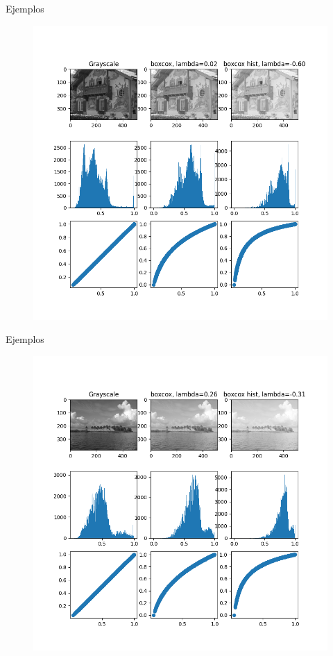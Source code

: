 \documentclass{beamer}
\begin{document}
\begin{frame}{Ejemplos}
\begin{figure}
    \centering
    \includegraphics[scale=0.3] {plot_I24.BMP.png  }
    \label{fig:my_label}
\end{figure}

\end{frame}
\begin{frame}{Ejemplos}
\begin{figure}
    \centering
    \includegraphics[scale=0.3] {plot_I16.BMP.png  }
    \label{fig:my_label}
\end{figure}

\end{frame}
\end{document}
